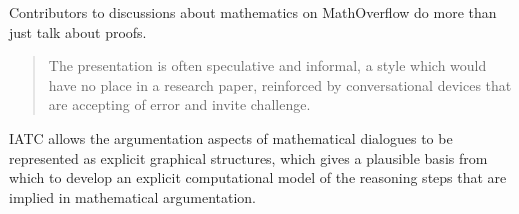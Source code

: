 \documentclass[smallextended,oneside]{svjour3}       %
\let\cite\citep
\newcommand\nothing[1]{#1}
\let\paragraph\nothing
\begin{document}
Contributors to discussions about mathematics on MathOverflow do more than just talk about proofs.
\begin{quote}
The presentation is often speculative and informal, a style which
would have no place in a research paper, reinforced by conversational
devices that are accepting of error and invite
challenge. \cite{martin2013does}
\end{quote}





\paragraph{IATC allows the argumentation aspects of mathematical dialogues to be represented as explicit graphical structures, which gives a plausible basis from which to develop an explicit computational model of the reasoning steps that are implied in mathematical argumentation.}
\end{document}
